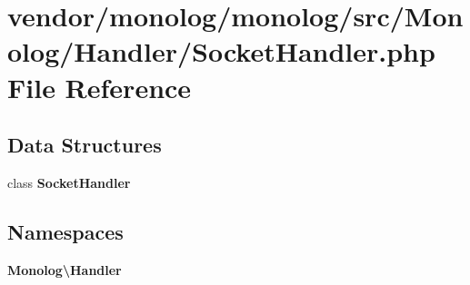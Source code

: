\section{vendor/monolog/monolog/src/\+Monolog/\+Handler/\+Socket\+Handler.php File Reference}
\label{_socket_handler_8php}
\subsection*{Data Structures}
\begin{DoxyCompactItemize}
\item 
class {\bf Socket\+Handler}
\end{DoxyCompactItemize}
\subsection*{Namespaces}
\begin{DoxyCompactItemize}
\item 
 {\bf Monolog\textbackslash{}\+Handler}
\end{DoxyCompactItemize}

